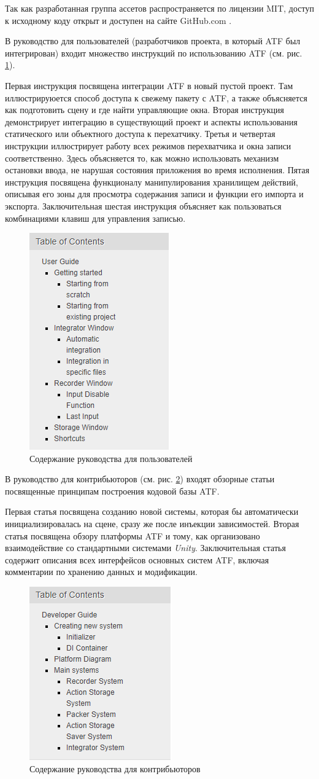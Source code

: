 Так как разработанная группа ассетов распространяется по лицензии MIT, доступ к исходному коду открыт и доступен на сайте GitHub.com \cite{git}.

В руководство для пользователей (разработчиков проекта, в который ATF был интегрирован) входит множество инструкций по использованию ATF (см. рис. \ref{user_online_docs}). 

Первая инструкция посвящена интеграции ATF в новый пустой проект. Там иллюстрируюется способ доступа к свежему пакету с ATF, а также объясняется как подготовить сцену и где найти управляющие окна. Вторая инструкция демонстрирует интеграцию в существующий проект и аспекты использования статического или объектного доступа к перехатчику. Третья и четвертая инструкции иллюстрирует работу всех режимов перехватчика и окна записи соответственно. Здесь объясняется то, как можно использовать механизм остановки ввода, не нарушая состояния приложения во время исполнения. Пятая инструкция посвящена функционалу манипулирования хранилищем действий, описывая его зоны для просмотра содержания записи и функции его импорта и экспорта. Заключительная шестая инструкция объясняет как пользоваться комбинациями клавиш для управления записью.

\begin{figure}[H]
	\centering
	\includegraphics[width=0.3\linewidth]{user_guide.PNG}
	\caption{Содержание руководства для пользователей}
	\label{user_online_docs}
\end{figure}

В руководство для контрибьюторов (см. рис. \ref{dev_online_docs}) входят обзорные статьи посвященные принципам построения кодовой базы ATF.

Первая статья посвящена созданию новой системы, которая бы автоматически инициализировалась на сцене, сразу же после инъекции зависимостей. Вторая статья посвящена обзору платформы ATF и тому, как организовано взаимодействие со стандартными системами \textit{Unity}. Заключительная статья содержит описания всех интерфейсов основных систем ATF, включая комментарии по хранению данных и модификации.

\begin{figure}[H]
	\centering
	\includegraphics[width=0.3\linewidth]{dev_guide.PNG}
	\caption{Содержание руководства для контрибьюторов}
	\label{dev_online_docs}
\end{figure}
